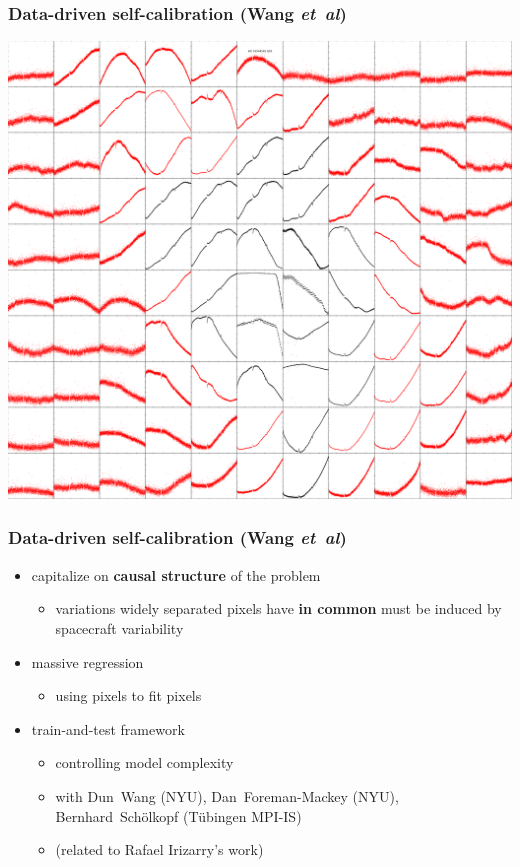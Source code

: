\documentclass[aspectratio=169]{beamer}
\newcommand{\foreign}[1]{\textsl{#1}}
\newcommand{\etal}{\foreign{et~al}}
\renewcommand{\emph}[1]{\textbf{#1}}
\begin{document}
\begin{frame}
  \frametitle{Data-driven self-calibration \small{(Wang \etal)}}
  \includegraphics[height=0.85\textheight]{kic_03544595_05_pixels.png}
\end{frame}

\begin{frame}
  \frametitle{Data-driven self-calibration \small{(Wang \etal)}}
  \begin{itemize}
  \item capitalize on \emph{causal structure} of the problem
    \begin{itemize}
    \item variations widely separated pixels have \emph{in common} must be induced by spacecraft variability
    \end{itemize}
  \item massive regression
    \begin{itemize}
    \item using pixels to fit pixels
    \end{itemize}
  \item train-and-test framework
    \begin{itemize}
    \item controlling model complexity
    \item with Dun~Wang (NYU), Dan~Foreman-Mackey (NYU), Bernhard~Sch\"olkopf (T\"ubingen MPI-IS)
    \item (related to Rafael Irizarry's work)
    \end{itemize}
  \end{itemize}
\end{frame}
\end{document}
